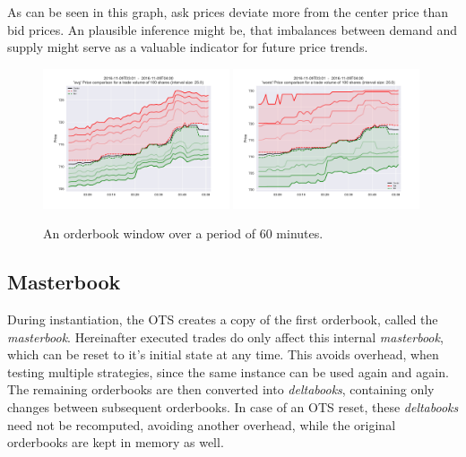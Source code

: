 As can be seen in this graph, ask prices deviate more from the center price than bid prices. An plausible inference might be, that imbalances between demand and supply might serve as a valuable indicator for future price trends.

\begin{figure}[ht]
	\centering
   \includegraphics[width=0.49\textwidth]{content/drawings/orderbook_window17} \includegraphics[width=0.49\textwidth]{content/drawings/orderbook_window17_worst}
	\caption{An orderbook window over a period of 60 minutes.}
	\label{fig:orderbookwindow}
\end{figure}

\subsection{Masterbook}
During instantiation, the \ac{OTS} creates a copy of the first orderbook, called the \emph{masterbook}. Hereinafter executed trades do only affect this internal \emph{masterbook}, which can be reset to it's initial state at any time. This avoids overhead, when testing multiple strategies, since the same instance can be used again and again.\\

The remaining orderbooks are then converted into \emph{deltabooks}, containing only changes between subsequent orderbooks. In case of an \ac{OTS} reset, these \emph{deltabooks} need not be recomputed, avoiding another overhead, while the original orderbooks are kept in memory as well.

